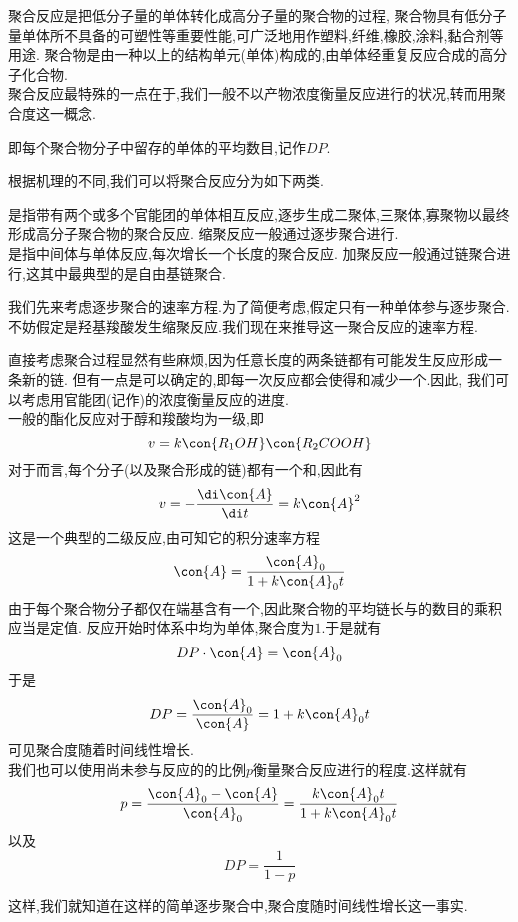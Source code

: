 \documentclass{ctexart}
\begin{document}
\indent 聚合反应是把低分子量的单体转化成高分子量的聚合物的过程,%
聚合物具有低分子量单体所不具备的可塑性等重要性能,可广泛地用作塑料,纤维,橡胶,涂料,黏合剂等用途.%
聚合物是由一种以上的结构单元(单体)构成的,由单体经重复反应合成的高分子化合物.\\
\indent 聚合反应最特殊的一点在于,我们一般不以产物浓度衡量反应进行的状况,转而用聚合度这一概念.
\begin{definition}[7D.2.1 聚合度]
    即每个聚合物分子中留存的单体的平均数目,记作$DP$.
\end{definition}
根据机理的不同,我们可以将聚合反应分为如下两类.
\begin{definition}[7D.2.2 逐步聚合与链聚合]
    是指带有两个或多个官能团的单体相互反应,逐步生成二聚体,三聚体,寡聚物以最终形成高分子聚合物的聚合反应.%
    缩聚反应一般通过逐步聚合进行.\\
    是指中间体与单体反应,每次增长一个长度的聚合反应.%
    加聚反应一般通过链聚合进行,这其中最典型的是自由基链聚合.
\end{definition}
我们先来考虑逐步聚合的速率方程.为了简便考虑,假定只有一种单体参与逐步聚合.%
不妨假定是羟基羧酸发生缩聚反应.我们现在来推导这一聚合反应的速率方程.
\begin{derivation}
    直接考虑聚合过程显然有些麻烦,因为任意长度的两条链都有可能发生反应形成一条新的链.%
    但有一点是可以确定的,即每一次反应都会使得和减少一个.因此,%
    我们可以考虑用官能团(记作)的浓度衡量反应的进度.\\
    一般的酯化反应对于醇和羧酸均为一级,即
    \[v=k\con{R_1OH}\con{R_2COOH}\]
    对于而言,每个分子(以及聚合形成的链)都有一个和,因此有
    \[v=-\dfrac{\di\con{A}}{\di t}=k\con{A}^2\]
    这是一个典型的二级反应,由可知它的积分速率方程
    \[\con{A}=\dfrac{\con{A}_0}{1+k\con{A}_0t}\]
    由于每个聚合物分子都仅在端基含有一个,因此聚合物的平均链长与的数目的乘积应当是定值.%
    反应开始时体系中均为单体,聚合度为$1$.于是就有
    \[DP\cdot\con{A}=\con{A}_0\]
    于是
    \[DP=\dfrac{\con{A}_0}{\con{A}}=1+k\con{A}_0t\]
    可见聚合度随着时间线性增长.\\
    我们也可以使用尚未参与反应的的比例$p$衡量聚合反应进行的程度.这样就有
    \[p=\dfrac{\con{A}_0-\con{A}}{\con{A}_0}=\dfrac{k\con{A}_0t}{1+k\con{A}_0t}\]
    以及
    \[DP=\dfrac{1}{1-p}\]

\end{derivation}
这样,我们就知道在这样的简单逐步聚合中,聚合度随时间线性增长这一事实.%
\end{document}
